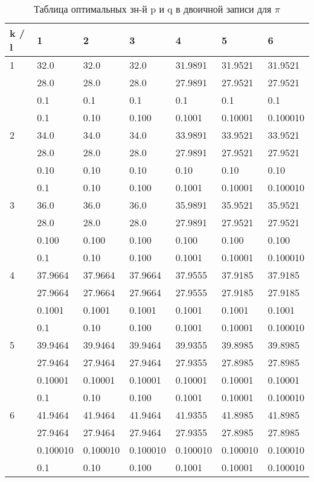 \documentclass[12pt]{article}
\begin{document}
\begin{table}[h]
	\caption{Таблица оптимальных зн-й p и q в двоичной записи для $\pi$}
	\label{table:piBinary}
	\begin{center}
		\begin{tabular}{|l|l|l|l|l|l|l|}
			\hline
			k / l &1 & 2 & 3 & 4 & 5 & 6\\
			\hline
			1 & 32.0& 32.0& 32.0& 31.9891& 31.9521& 31.9521\\
			& 28.0& 28.0& 28.0& 27.9891& 27.9521& 27.9521\\
			& 0.1& 0.1& 0.1& 0.1& 0.1& 0.1\\
			& 0.1& 0.10& 0.100& 0.1001& 0.10001& 0.100010\\
			\hline
			2 & 34.0& 34.0& 34.0& 33.9891& 33.9521& 33.9521\\
			& 28.0& 28.0& 28.0& 27.9891& 27.9521& 27.9521\\
			& 0.10& 0.10& 0.10& 0.10& 0.10& 0.10\\
			& 0.1& 0.10& 0.100& 0.1001& 0.10001& 0.100010\\
			\hline
			3 & 36.0& 36.0& 36.0& 35.9891& 35.9521& 35.9521\\
			& 28.0& 28.0& 28.0& 27.9891& 27.9521& 27.9521\\
			& 0.100& 0.100& 0.100& 0.100& 0.100& 0.100\\
			& 0.1& 0.10& 0.100& 0.1001& 0.10001& 0.100010\\
			\hline
			4 & 37.9664& 37.9664& 37.9664& 37.9555& 37.9185& 37.9185\\
			& 27.9664& 27.9664& 27.9664& 27.9555& 27.9185& 27.9185\\
			& 0.1001& 0.1001& 0.1001& 0.1001& 0.1001& 0.1001\\
			& 0.1& 0.10& 0.100& 0.1001& 0.10001& 0.100010\\
			\hline
			5 & 39.9464& 39.9464& 39.9464& 39.9355& 39.8985& 39.8985\\
			& 27.9464& 27.9464& 27.9464& 27.9355& 27.8985& 27.8985\\
			& 0.10001& 0.10001& 0.10001& 0.10001& 0.10001& 0.10001\\
			& 0.1& 0.10& 0.100& 0.1001& 0.10001& 0.100010\\
			\hline
			6 & 41.9464& 41.9464& 41.9464& 41.9355& 41.8985& 41.8985\\
			& 27.9464& 27.9464& 27.9464& 27.9355& 27.8985& 27.8985\\
			& 0.100010& 0.100010& 0.100010& 0.100010& 0.100010& 0.100010\\
			& 0.1& 0.10& 0.100& 0.1001& 0.10001& 0.100010\\
			\hline
		\end{tabular}
	\end{center}
\end{table}
	
\end{document}
